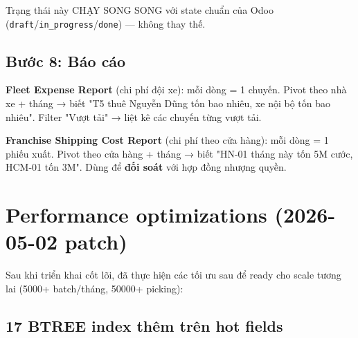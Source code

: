 Trạng thái này CHẠY SONG SONG với state chuẩn của Odoo (\texttt{draft}/\texttt{in\_progress}/\texttt{done}) --- không thay thế.

\subsection{Bước 8: Báo cáo}

\textbf{Fleet Expense Report} (chi phí đội xe): mỗi dòng = 1 chuyến. Pivot theo nhà xe + tháng → biết "T5 thuê Nguyễn Dũng tốn bao nhiêu, xe nội bộ tốn bao nhiêu". Filter "Vượt tải" → liệt kê các chuyến từng vượt tải.

\textbf{Franchise Shipping Cost Report} (chi phí theo cửa hàng): mỗi dòng = 1 phiếu xuất. Pivot theo cửa hàng + tháng → biết "HN-01 tháng này tốn 5M cước, HCM-01 tốn 3M". Dùng để \textbf{đối soát} với hợp đồng nhượng quyền.

\section{Performance optimizations (2026-05-02 patch)}

Sau khi triển khai cốt lõi, đã thực hiện các tối ưu sau để ready cho scale tương lai (5000+ batch/tháng, 50000+ picking):

\subsection{17 BTREE index thêm trên hot fields}


